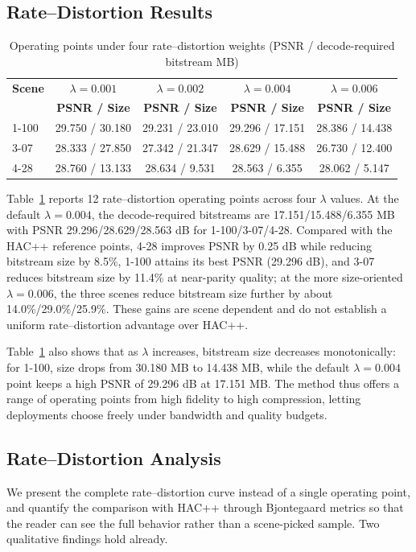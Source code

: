 \documentclass[conference]{IEEEtran}
\begin{document}
\subsection{Rate--Distortion Results}
\begin{table}[t]
\caption{Operating points under four rate--distortion weights
(PSNR / decode-required bitstream MB)}
\centering
\small
\begin{tabular}{@{}l cccc@{}}
\toprule
\textbf{Scene} & \(\lambda=0.001\) & \(\lambda=0.002\) &
\(\lambda=0.004\) & \(\lambda=0.006\) \\
\textbf{} & \textbf{PSNR / Size} & \textbf{PSNR / Size} &
\textbf{PSNR / Size} & \textbf{PSNR / Size} \\
\midrule
1-100 & 29.750 / 30.180 & 29.231 / 23.010 & 29.296 / 17.151 &
28.386 / 14.438 \\
3-07 & 28.333 / 27.850 & 27.342 / 21.347 & 28.629 / 15.488 &
26.730 / 12.400 \\
4-28 & 28.760 / 13.133 & 28.634 / 9.531 & 28.563 / 6.355 &
28.062 / 5.147 \\
\bottomrule
\end{tabular}
\label{tab:rd}
\end{table}
Table~\ref{tab:rd} reports 12 rate--distortion operating points across
four $\lambda$ values. At the default $\lambda=0.004$, the
decode-required bitstreams are 17.151/15.488/6.355 MB with PSNR
29.296/28.629/28.563 dB for 1-100/3-07/4-28. Compared with the HAC++
reference points, 4-28 improves PSNR by 0.25 dB while reducing bitstream
size by 8.5\%, 1-100 attains its best PSNR (29.296 dB), and 3-07 reduces
bitstream size by 11.4\% at near-parity quality; at the more size-oriented
$\lambda=0.006$, the three scenes reduce bitstream size further by about
14.0\%/29.0\%/25.9\%. These gains are scene dependent and do not establish
a uniform rate--distortion advantage over HAC++.

Table~\ref{tab:rd} also shows that as $\lambda$ increases, bitstream size
decreases monotonically: for 1-100, size drops from 30.180 MB to 14.438
MB, while the default $\lambda=0.004$ point keeps a high PSNR of 29.296
dB at 17.151 MB. The method thus offers a range of operating points from
high fidelity to high compression, letting deployments choose
freely under bandwidth and quality budgets.

\subsection{Rate--Distortion Analysis}
\label{sec:rd}
We present the complete rate--distortion curve instead of a single
operating point, and quantify the comparison with HAC++ through
Bjontegaard metrics so that the reader can see the full behavior rather
than a scene-picked sample. Two qualitative findings hold already.
\end{document}
